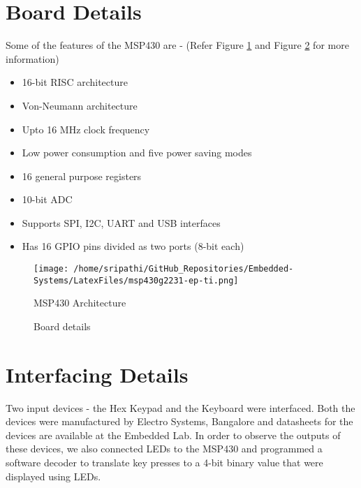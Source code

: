 \documentclass[12pt, letterpaper]{article}
\begin{document}
\section{Board Details}

Some of the features of the MSP430 are - (Refer Figure \ref{fig:architecture} and Figure \ref{fig:board} for more information)

\begin{itemize}
	\item 16-bit RISC architecture
	\item Von-Neumann architecture
	\item Upto 16 MHz clock frequency
	\item Low power consumption and five power saving modes
	\item 16 general purpose registers
	\item 10-bit ADC
	\item Supports SPI, I2C, UART and USB interfaces
	\item Has 16 GPIO pins divided as two ports (8-bit each)
\end{itemize}
	
\begin{figure}[t]
	\centering
	\texttt{[image: /home/sripathi/GitHub\_Repositories/Embedded-Systems/LatexFiles/msp430g2231-ep-ti.png]}
	\caption{MSP430 Architecture}
	\label{fig:architecture}
\end{figure}

\begin{figure}[t]
	\centering
		\caption{Board details}
		\label{fig:board}
\end{figure}

\section{Interfacing Details}

Two input devices - the Hex Keypad and the Keyboard were interfaced. Both the devices were manufactured by Electro Systems, Bangalore and datasheets for the devices are available at the Embedded Lab. In order to observe the outputs of these devices, we also connected LEDs to the MSP430 and programmed a software decoder to translate key presses to a 4-bit binary value that were displayed using LEDs. 
\end{document}
